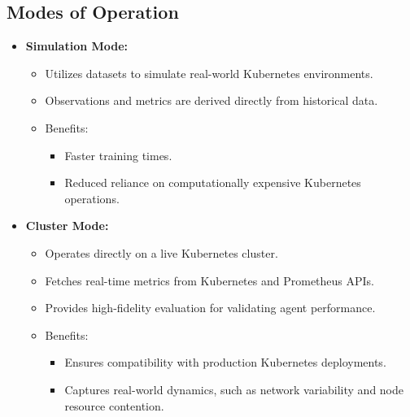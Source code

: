 \documentclass[conference]{IEEEtran}
\begin{document}
\subsection{Modes of Operation}
\begin{itemize}
    \item \textbf{Simulation Mode:}
    \begin{itemize}
        \item Utilizes datasets to simulate real-world Kubernetes environments.
        \item Observations and metrics are derived directly from historical data.
        \item Benefits:
        \begin{itemize}
            \item Faster training times.
            \item Reduced reliance on computationally expensive Kubernetes operations.
        \end{itemize}
    \end{itemize}
    \item \textbf{Cluster Mode:}
    \begin{itemize}
        \item Operates directly on a live Kubernetes cluster.
        \item Fetches real-time metrics from Kubernetes and Prometheus APIs.
        \item Provides high-fidelity evaluation for validating agent performance.
        \item Benefits:
        \begin{itemize}
            \item Ensures compatibility with production Kubernetes deployments.
            \item Captures real-world dynamics, such as network variability and node resource contention.
        \end{itemize}
    \end{itemize}
\end{itemize}
\end{document}
